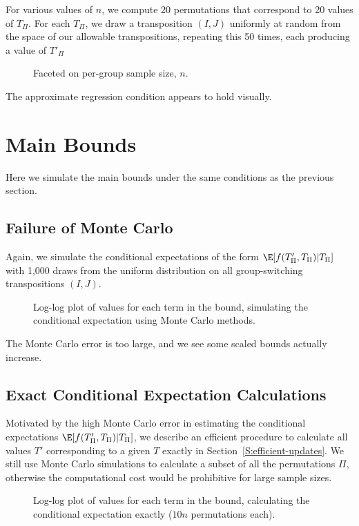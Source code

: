 For various values of $n$, we compute 20 permutations that correspond to 20 values of $T_{\Pi}$.
For each $T_{\Pi}$, we draw a transposition $(I, J)$ uniformly at random from the space of our
allowable transpositions, repeating this 50 times, each producing a value of $T'_{\Pi}$
\begin{figure}[!ht]
  \centering
  \resizebox{12.0cm}{!}{}
  \caption{Faceted on per-group sample size, $n$.}
\end{figure}

The approximate regression condition appears to hold visually.
\clearpage

\section{Main Bounds}
Here we simulate the main bounds under the same conditions as the previous section.
\subsection{Failure of Monte Carlo}
Again, we simulate the conditional expectations of the form $\E[f(T'_{\Pi}, T_{\Pi}) | T_{\Pi}]$
with 1,000 draws from the uniform distribution on all group-switching transpositions $(I, J)$.

\begin{figure}[!ht]
  \centering
  
  \caption{Log-log plot of values for each term in the bound,
    simulating the conditional expectation using Monte Carlo methods.}
\end{figure}
The Monte Carlo error is too large, and we see some scaled bounds actually increase.
\clearpage

\subsection{Exact Conditional Expectation Calculations}
Motivated by the high Monte Carlo error in estimating the conditional expectations
$\E[f(T'_{\Pi}, T_{\Pi}) | T_{\Pi}]$, we describe an efficient procedure to
calculate all values $T'$ corresponding to a given $T$ exactly in Section~\ref{S:efficient-updates}.
We still use Monte Carlo simulations to calculate a subset of all the permutations $\Pi$, otherwise
the computational cost would be prohibitive for large sample sizes.
\begin{figure}[!ht]
  \centering
  
  \caption{Log-log plot of values for each term in the bound, calculating the conditional
    expectation exactly ($10n$ permutations each).}
\end{figure}

